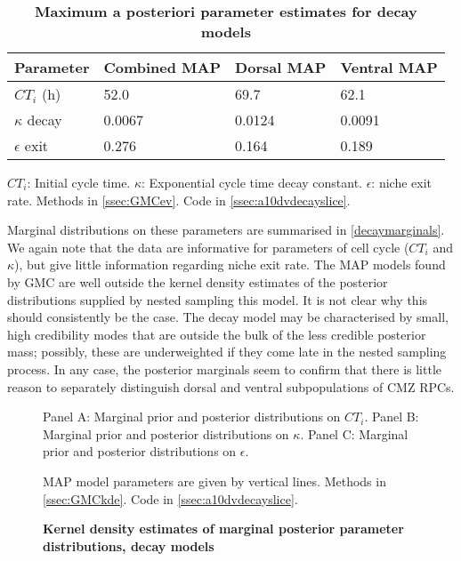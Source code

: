 \begin{table}[!ht]
    \centering
    \caption{{\bf Maximum a posteriori parameter estimates for decay models}}
    \begin{tabular}{|l|l|l|l|}
        \hline
        {\bf Parameter} & {\bf Combined MAP} & {\bf Dorsal MAP} & {\bf Ventral MAP}\\ \hline
        $CT_{i}$ (h) & 52.0 & 69.7 & 62.1\\ \hline
        $\kappa$ decay& 0.0067 & 0.0124 & 0.0091\\ \hline
        $\epsilon$ exit& 0.276 & 0.164 & 0.189\\ \hline
    \end{tabular}
    \begin{flushleft}
        $CT_{i}$: Initial cycle time.
        $\kappa$: Exponential cycle time decay constant.
        $\epsilon$: niche exit rate.
        Methods in \autoref{ssec:GMCev}.
        Code in \autoref{ssec:a10dvdecayslice}.    
    \end{flushleft}
    \label{decayMAPtable}
\end{table}

Marginal distributions on these parameters are summarised in \autoref{decaymarginals}. We again note that the data are informative for parameters of cell cycle ($CT_{i}$ and $\kappa$), but give little information regarding niche exit rate. The MAP models found by GMC are well outside the kernel density estimates of the posterior distributions supplied by nested sampling this model. It is not clear why this should consistently be the case. The decay model may be characterised by small, high credibility modes that are outside the bulk of the less credible posterior mass; possibly, these are underweighted if they come late in the nested sampling process. In any case, the posterior marginals seem to confirm that there is little reason to separately distinguish dorsal and ventral subpopulations of CMZ RPCs.

\begin{figure}[!h]
    \caption{{\bf Kernel density estimates of marginal posterior parameter distributions, decay models}}
    \label{decaymarginals}

    Panel A: Marginal prior and posterior distributions on $CT_{i}$.
    Panel B: Marginal prior and posterior distributions on $\kappa$.
    Panel C: Marginal prior and posterior distributions on $\epsilon$.

    MAP model parameters are given by vertical lines.
    Methods in \autoref{ssec:GMCkde}.
    Code in \autoref{ssec:a10dvdecayslice}.    
\end{figure}

